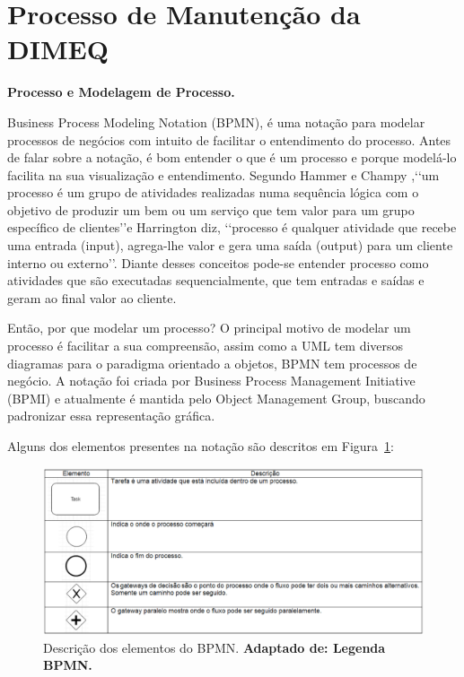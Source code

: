 
\section{Processo de Manutenção da DIMEQ}
\label{bpmn}

\textbf{Processo e Modelagem de Processo.}

Business Process Modeling Notation (BPMN), é uma notação para modelar processos de negócios com intuito de facilitar o entendimento do processo. Antes de falar sobre a notação, é bom entender o que é um processo e porque modelá-lo facilita na sua visualização e entendimento. Segundo Hammer e Champy \cite{hammer1994reengenharia},\lq\lq um processo é um grupo de atividades realizadas numa sequência lógica com o objetivo de produzir um bem ou um serviço que tem valor para um grupo específico de clientes\rq\rq e Harrington \cite{harrington1993aperfeiccoando} diz, \lq\lq processo é qualquer atividade que recebe uma entrada (input), agrega-lhe valor e gera uma saída (output) para um cliente interno ou externo\rq\rq. Diante desses conceitos pode-se entender processo como atividades que são executadas sequencialmente, que tem entradas e saídas e geram ao final valor ao cliente.

Então, por que modelar um processo? O principal motivo de modelar um processo é facilitar a sua compreensão, assim como a UML tem diversos diagramas para o paradigma orientado a objetos, BPMN tem processos de negócio. A notação foi criada por Business Process Management Initiative (BPMI) e atualmente é mantida pelo Object Management Group, buscando padronizar essa representação gráfica.

Alguns dos elementos presentes na notação são descritos em Figura~\ref{table-processo}:


\graphicspath{{figuras/}}
\begin{figure}[H]
\centering
\includegraphics[width=1.0 \textwidth]{tabela-processo}
\caption{Descrição dos elementos do BPMN. \textbf{Adaptado de: Legenda BPMN.}}
\label{table-processo}
\end{figure}


